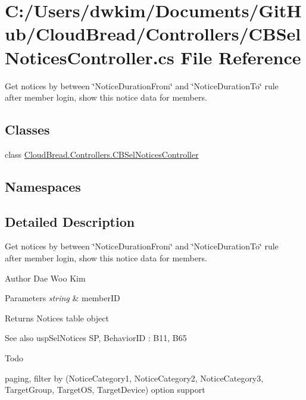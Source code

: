 \hypertarget{a00151}{}\section{C\+:/\+Users/dwkim/\+Documents/\+Git\+Hub/\+Cloud\+Bread/\+Controllers/\+C\+B\+Sel\+Notices\+Controller.cs File Reference}
\label{a00151}


Get notices by between \char`\"{}\+Notice\+Duration\+From\char`\"{} and \char`\"{}\+Notice\+Duration\+To\char`\"{} rule ~\newline
after member login, show this notice data for members.  


\subsection*{Classes}
\begin{DoxyCompactItemize}
\item 
class \hyperlink{a00039}{Cloud\+Bread.\+Controllers.\+C\+B\+Sel\+Notices\+Controller}
\end{DoxyCompactItemize}
\subsection*{Namespaces}
\begin{DoxyCompactItemize}
\end{DoxyCompactItemize}


\subsection{Detailed Description}
Get notices by between \char`\"{}\+Notice\+Duration\+From\char`\"{} and \char`\"{}\+Notice\+Duration\+To\char`\"{} rule ~\newline
after member login, show this notice data for members. 

\begin{DoxyAuthor}{Author}
Dae Woo Kim 
\end{DoxyAuthor}

\begin{DoxyParams}{Parameters}
{\em string} & member\+ID \\
\hline
\end{DoxyParams}
\begin{DoxyReturn}{Returns}
Notices table object 
\end{DoxyReturn}
\begin{DoxySeeAlso}{See also}
usp\+Sel\+Notices SP, Behavior\+ID \+: B11, B65 
\end{DoxySeeAlso}
\begin{DoxyRefDesc}{Todo}
\item[\hyperlink{a00001__todo000015}{Todo}]paging, filter by (Notice\+Category1, Notice\+Category2, Notice\+Category3, Target\+Group, Target\+OS, Target\+Device) option support \end{DoxyRefDesc}
